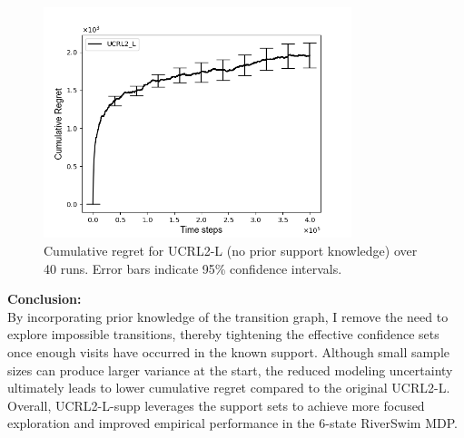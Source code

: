\begin{figure}[H]
  \centering
  \includegraphics[width=0.8\textwidth]{Code/4/Figure_UCRL2_L_cumulative_regret.png}
  \caption{Cumulative regret for UCRL2-L (no prior support knowledge) over 40 runs. Error bars indicate 95\% confidence intervals.}
  \label{fig:orig_regret}
\end{figure}

\bigskip
\noindent\textbf{Conclusion:}\\
By incorporating prior knowledge of the transition graph, I remove the need to explore impossible transitions, thereby tightening the effective confidence sets once enough visits have occurred in the known support. Although small sample sizes can produce larger variance at the start, the reduced modeling uncertainty ultimately leads to lower cumulative regret compared to the original UCRL2-L. Overall, UCRL2-L-supp leverages the support sets to achieve more focused exploration and improved empirical performance in the 6-state RiverSwim MDP.